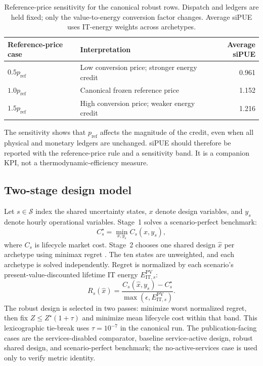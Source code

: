 \documentclass[preprint,12pt]{elsarticle}
\begin{document}
\begin{table}[tbp]
\centering
\small
\caption{Reference-price sensitivity for the canonical robust rows. Dispatch and ledgers are held fixed; only the value-to-energy conversion factor changes. Average siPUE uses IT-energy weights across archetypes.}
\label{tab:pref-sensitivity}
\begin{tabularx}{\linewidth}{L{3.0cm} Y r}
\toprule
Reference-price case & Interpretation & Average siPUE \\
\midrule
$0.5p_{\text{ref}}$ & Low conversion price; stronger energy credit & 0.961 \\
$1.0p_{\text{ref}}$ & Canonical frozen reference price & 1.152 \\
$1.5p_{\text{ref}}$ & High conversion price; weaker energy credit & 1.216 \\
\bottomrule
\end{tabularx}
\end{table}

The sensitivity shows that $p_{\text{ref}}$ affects the magnitude of the credit, even when all physical and monetary ledgers are unchanged. siPUE should therefore be reported with the reference-price rule and a sensitivity band. It is a companion KPI, not a thermodynamic-efficiency measure.

\subsection{Two-stage design model}

Let $s \in \mathcal{S}$ index the shared uncertainty states, $x$ denote design variables, and $y_s$ denote hourly operational variables. Stage~1 solves a scenario-perfect benchmark:
\begin{equation}
C_s^{\star} = \min_{x,y_s} C_s(x,y_s),
\label{eq:stage-one}
\end{equation}
where $C_s$ is lifecycle market cost. Stage~2 chooses one shared design $\hat{x}$ per archetype using minimax regret \cite{savage1951theory,MR-1626-RPC}. The ten states are unweighted, and each archetype is solved independently. Regret is normalized by each scenario's present-value-discounted lifetime IT energy $E_{\text{IT},s}^{\text{PV}}$:
\begin{equation}
R_s(\hat{x}) =
\frac{C_s(\hat{x},y_s)-C_s^{\star}}{\max(\epsilon, E_{\text{IT},s}^{\text{PV}})}.
\label{eq:normalised-regret}
\end{equation}
The robust design is selected in two passes: minimize worst normalized regret, then fix $Z \le Z^{\star}(1+\tau)$ and minimize mean lifecycle cost within that band. This lexicographic tie-break \cite{Miettinen1999,Ehrgott2005} uses $\tau = 10^{-7}$ in the canonical run. The publication-facing cases are the services-disabled comparator, baseline service-active design, robust shared design, and scenario-perfect benchmark; the no-active-services case is used only to verify metric identity.
\end{document}
